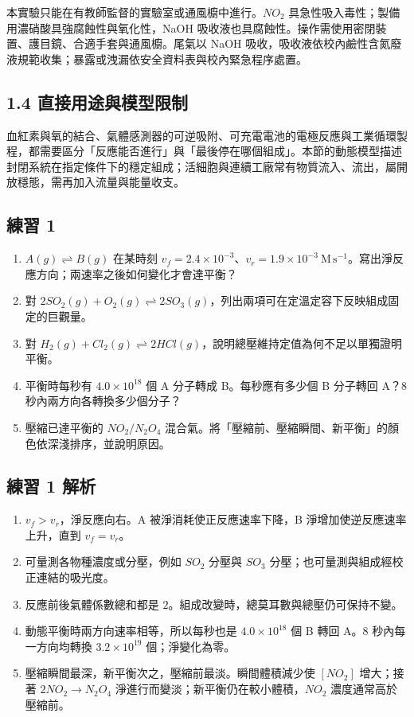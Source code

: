 \documentclass[11pt,a4paper]{article}
\providecommand{\tightlist}{%
  \setlength{\itemsep}{0pt}\setlength{\parskip}{0pt}}
\begin{document}
本實驗只能在有教師監督的實驗室或通風櫥中進行。\(NO_2\) 具急性吸入毒性；製備用濃硝酸具強腐蝕性與氧化性，NaOH 吸收液也具腐蝕性。操作需使用密閉裝置、護目鏡、合適手套與通風櫥。尾氣以 NaOH 吸收，吸收液依校內鹼性含氮廢液規範收集；暴露或洩漏依安全資料表與校內緊急程序處置。

\subsection{1.4 直接用途與模型限制}\label{ux76f4ux63a5ux7528ux9014ux8207ux6a21ux578bux9650ux5236}

血紅素與氧的結合、氣體感測器的可逆吸附、可充電電池的電極反應與工業循環製程，都需要區分「反應能否進行」與「最後停在哪個組成」。本節的動態模型描述封閉系統在指定條件下的穩定組成；活細胞與連續工廠常有物質流入、流出，屬開放穩態，需再加入流量與能量收支。

\subsection{練習 1}\label{ux7df4ux7fd2-1}

\begin{enumerate}
\def\labelenumi{\arabic{enumi}.}
\tightlist
\item
  \(A(g)\rightleftharpoons B(g)\) 在某時刻 \(v_f=2.4\times10^{-3}\)、\(v_r=1.9\times10^{-3}\ \mathrm{M\,s^{-1}}\)。寫出淨反應方向；兩速率之後如何變化才會達平衡？
\item
  對 \(2SO_2(g)+O_2(g)\rightleftharpoons2SO_3(g)\)，列出兩項可在定溫定容下反映組成固定的巨觀量。
\item
  對 \(H_2(g)+Cl_2(g)\rightleftharpoons2HCl(g)\)，說明總壓維持定值為何不足以單獨證明平衡。
\item
  平衡時每秒有 \(4.0\times10^{18}\) 個 A 分子轉成 B。每秒應有多少個 B 分子轉回 A？8 秒內兩方向各轉換多少個分子？
\item
  壓縮已達平衡的 \(NO_2/N_2O_4\) 混合氣。將「壓縮前、壓縮瞬間、新平衡」的顏色依深淺排序，並說明原因。
\end{enumerate}

\subsection{練習 1 解析}\label{ux7df4ux7fd2-1-ux89e3ux6790}

\begin{enumerate}
\def\labelenumi{\arabic{enumi}.}
\tightlist
\item
  \(v_f>v_r\)，淨反應向右。A 被淨消耗使正反應速率下降，B 淨增加使逆反應速率上升，直到 \(v_f=v_r\)。
\item
  可量測各物種濃度或分壓，例如 \(SO_2\) 分壓與 \(SO_3\) 分壓；也可量測與組成經校正連結的吸光度。
\item
  反應前後氣體係數總和都是 \(2\)。組成改變時，總莫耳數與總壓仍可保持不變。
\item
  動態平衡時兩方向速率相等，所以每秒也是 \(4.0\times10^{18}\) 個 B 轉回 A。8 秒內每一方向均轉換 \(3.2\times10^{19}\) 個；淨變化為零。
\item
  壓縮瞬間最深，新平衡次之，壓縮前最淡。瞬間體積減少使 \([NO_2]\) 增大；接著 \(2NO_2\to N_2O_4\) 淨進行而變淡；新平衡仍在較小體積，\(NO_2\) 濃度通常高於壓縮前。
\end{enumerate}
\end{document}
